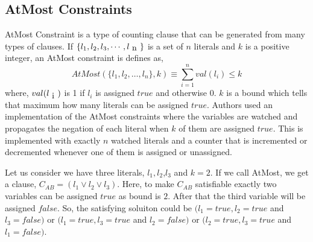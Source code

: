 \subsection{AtMost Constraints}
AtMost Constraint is a type of counting clause that can be generated from many types of clauses. If $\{l_{1}, l_{2}, l_{3},\cdots ,l_{\text n}\}$ is a set of $n$ literals and $k$ is a positive integer, an AtMost constraint is defines as,\newline
$$AtMost(\{l_{1},l_{2},\ldots,l_{n}\},k)\equiv \sum\limits^{n}_{i=1} val(l_{i})\leqslant k$$
where, $val(l_{\text i})$ is 1 if $l_{i}$ is assigned $true$ and otherwise 0. $k$ is a bound which tells that maximum how many literals can be assigned $true$.\newline
Authors used an implementation of the AtMost constraints where the variables are watched and propagates the negation of each literal when $k$ of them are assigned $true$. This is implemented with exactly $n$ watched literals and a counter that is incremented or decremented whenever one of them is assigned or unassigned.
\begin{example}
Let us consider we have three literals, $l_{1}, l_{2}$,$l_{3}$ and $k=2$. If we call AtMost, we get a clause, $C_{AB}=(l_{1}\vee l_{2}\vee l_{3})$. Here, to make $C_{AB}$ satisfiable exactly two variables can be assigned $true$ as bound is $2$. After that the third variable will be assigned $false$. So, the satisfying soluiton could be $(l_{1}=true, l_{2}=true$ and $l_{3}=false)$ or $(l_{1}=true, l_{3}=true$ and $l_{2}=false)$ or $(l_{2}=true, l_{3}=true$ and $l_{1}=false)$.
\end{example}

